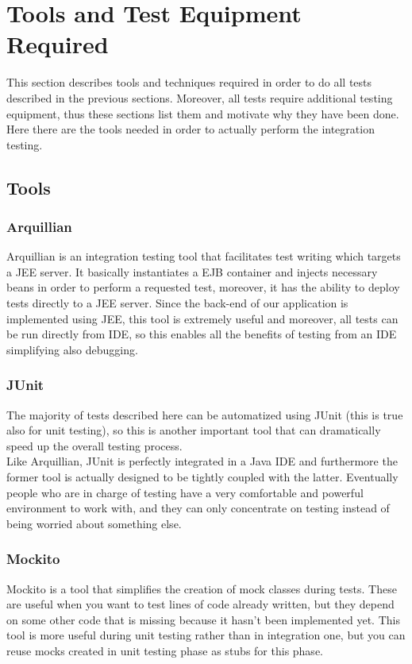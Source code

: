 \newpage
\section{Tools and Test Equipment Required}
This section describes tools and techniques required in order to do all tests described in the previous sections. Moreover, all tests require additional testing equipment, thus these sections list them and motivate why they have been done. \\
Here there are the tools needed in order to actually perform the integration testing.

\subsection{Tools}

\subsubsection{Arquillian}
Arquillian is an integration testing tool that facilitates test writing which targets a JEE server. It basically instantiates a EJB container and injects necessary beans in order to perform a requested test, moreover, it has the ability to deploy tests directly to a JEE server. Since the back-end of our application is implemented using JEE, this tool is extremely useful and moreover, all tests can be run directly from IDE, so this enables all the benefits of testing from an IDE simplifying also debugging.

\subsubsection{JUnit}
The majority of tests described here can be automatized using JUnit (this is true also for unit testing), so this is another important tool that can dramatically speed up the overall testing process. \\ Like Arquillian, JUnit is perfectly integrated in a Java IDE and furthermore the former tool is actually designed to be tightly coupled with the latter. Eventually people who are in charge of testing have a very comfortable and powerful environment to work with, and they can only concentrate on testing instead of being worried about something else. 

\subsubsection{Mockito}
Mockito is a tool that simplifies the creation of mock classes during tests. These are useful when you want to test lines of code already written, but they depend on some other code that is missing because it hasn't been implemented yet. This tool is more useful during unit testing rather than in integration one, but you can reuse mocks created in unit testing phase as stubs for this phase.

